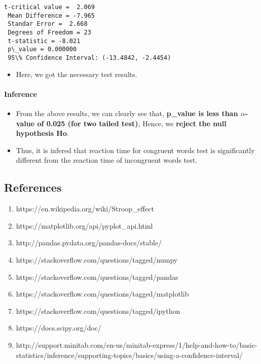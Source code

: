 \documentclass[11pt]{article}
\providecommand{\tightlist}{%
      \setlength{\itemsep}{0pt}\setlength{\parskip}{0pt}}
\begin{document}
    \begin{Verbatim}[commandchars=\\\{\}]
 t-critical value =  2.069
 Mean Difference = -7.965
 Standar Error =  2.668 
 Degrees of Freedom = 23
 t-statistic = -8.021 
 p\_value = 0.000000
 95\% Confidence Interval: (-13.4842, -2.4454)

    \end{Verbatim}

    \begin{itemize}
\tightlist
\item
  Here, we got the necessary test results.
\end{itemize}

\paragraph{Inference}\label{inference}

\begin{itemize}
\item
  From the above results, we can clearly see that, \textbf{p\_value is
  less than \(\alpha\)-value of 0.025 (for two tailed test)}, Hence, we
  \textbf{reject the null hypothesis Ho}.
\item
  Thus, it is infered that reaction time for congruent words test is
  significantly different from the reaction time of incongruent words
  test.
\end{itemize}

    \subsection{References}\label{references}

    \begin{enumerate}
\def\labelenumi{\arabic{enumi}.}
\item
  https://en.wikipedia.org/wiki/Stroop\_effect
\item
  https://matplotlib.org/api/pyplot\_api.html
\item
  http://pandas.pydata.org/pandas-docs/stable/
\item
  https://stackoverflow.com/questions/tagged/numpy
\item
  https://stackoverflow.com/questions/tagged/pandas
\item
  https://stackoverflow.com/questions/tagged/matplotlib
\item
  https://stackoverflow.com/questions/tagged/ipython
\item
  https://docs.scipy.org/doc/
\item
  http://support.minitab.com/en-us/minitab-express/1/help-and-how-to/basic-statistics/inference/supporting-topics/basics/using-a-confidence-interval/
\end{enumerate}


    
    
    
    
\end{document}
